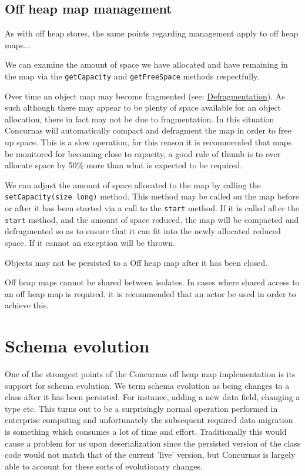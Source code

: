 \documentclass[conc-doc]{subfiles}
\begin{document}
\subsection{Off heap map management}
As with off heap stores, the same points regarding management apply to  off heap maps...

We can examine the amount of space we have allocated and have remaining in the map via the \lstinline{getCapacity} and \lstinline{getFreeSpace} methods respectfully.

Over time an object map may become fragmented (see: \href{https://en.wikipedia.org/wiki/Defragmentation}{Defragmentation}). As such although there may appear to be plenty of space available for an object allocation, there in fact may not be due to fragmentation. In this situation Concurnas will automatically compact and defragment the map in order to free up space. This is a slow operation, for this reason it is recommended that maps be monitored for becoming close to capacity, a good rule of thumb is to over allocate space by 50\% more than what is expected to be required.

We can adjust the amount of space allocated to the map by calling the \lstinline{setCapacity(size long)} method. This method may be called on the map before or after it has been started via a call to the \lstinline{start} method. If it is called after the \lstinline{start} method, and the amount of space reduced, the map will be compacted and defragmented so as to ensure that it can fit into the newly allocated reduced space. If it cannot an exception will be thrown.

Objects may not be persisted to a Off heap map after it has been closed.

Off heap maps cannot be shared between isolates. In cases where shared access to an off heap map is required, it is recommended that an actor be used in order to achieve this. 


\section{Schema evolution}
One of the strongest points of the Concurnas off heap map implementation is its support for schema evolution. We term schema evolution as being changes to a class after it has been persisted. For instance, adding a new data field, changing a type etc. This turns out to be a surprisingly normal operation performed in enterprise computing and unfortunately the subsequent required data migration is something which consumes a lot of time and effort. Traditionally this would cause a problem for us upon deserialization since the persisted version of the class code would not match that of the current 'live' version, but Concurnas is largely able to account for these sorts of evolutionary changes.
\end{document}
